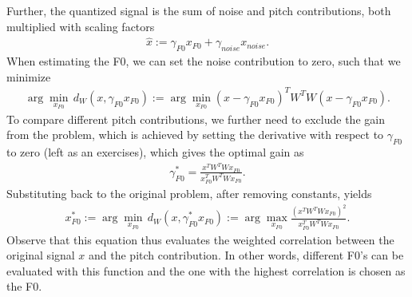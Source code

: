 \documentclass[letterpaper,10pt,english]{jupyterBook}
\begin{document}
\sphinxAtStartPar
Further, the quantized signal is the sum of noise and pitch
contributions, both multiplied with scaling factors
\begin{equation*}
\begin{split} \hat x := \gamma_{F0} x_{F0} + \gamma_{noise} x_{noise}.
\end{split}
\end{equation*}
\sphinxAtStartPar
When estimating the F0, we can set the noise contribution to zero, such
that we minimize
\begin{equation*}
\begin{split} \arg\min_{x_{F0}}\, d_W(x,\gamma_{F0}x_{F0}):=
\arg\min_{x_{F0}}(x-\gamma_{F0}x_{F0})^T W^T W
(x-\gamma_{F0}x_{F0}). \end{split}
\end{equation*}
\sphinxAtStartPar
To compare different pitch contributions, we further need to exclude the
gain from the problem, which is achieved by setting the derivative with
respect to \( \gamma_{F0} \) to zero (left as an exercises), which
gives the optimal gain as
\begin{equation*}
\begin{split} \gamma_{F0}^* = \frac{x^TW^T W x_{F0}}{x_{F0}^TW^T W
x_{F0}}. \end{split}
\end{equation*}
\sphinxAtStartPar
Substituting back to the original problem, after removing constants,
yields
\begin{equation*}
\begin{split} x_{F0}^*:=\arg\min_{x_{F0}}\,
d_W(x,\gamma_{F0}^*x_{F0}):= \arg\max_{x_{F0}}
\frac{\left(x^TW^T W x_{F0}\right)^2}{x_{F0}^TW^T W x_{F0}}. \end{split}
\end{equation*}
\sphinxAtStartPar
Observe that this equation thus evaluates the weighted correlation
between the original signal \(x\) and the pitch contribution. In other
words, different F0’s can be evaluated with this function and the one
with the highest correlation is chosen as the F0.
\end{document}
